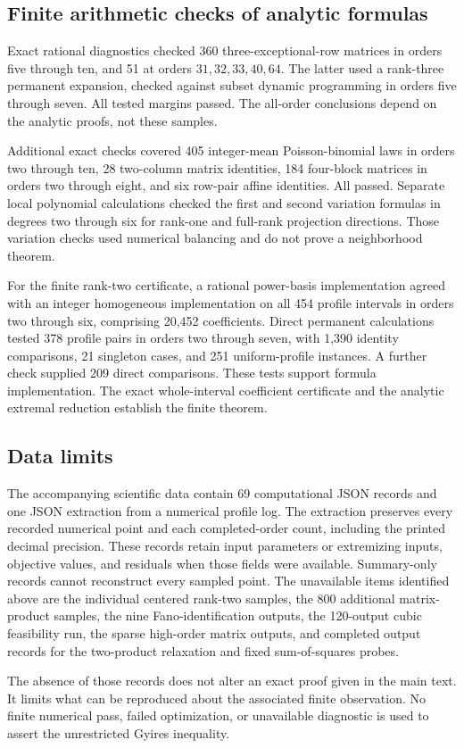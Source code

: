 \subsection{Finite arithmetic checks of analytic formulas}\label{app:finite-13}

Exact rational diagnostics checked 360 three-exceptional-row matrices in orders five through ten, and 51 at orders \(31,32,33,40,64\). The latter used a rank-three permanent expansion, checked against subset dynamic programming in orders five through seven. All tested margins passed. The all-order conclusions depend on the analytic proofs, not these samples.

Additional exact checks covered 405 integer-mean Poisson-binomial laws in orders two through ten, 28 two-column matrix identities, 184 four-block matrices in orders two through eight, and six row-pair affine identities. All passed. Separate local polynomial calculations checked the first and second variation formulas in degrees two through six for rank-one and full-rank projection directions. Those variation checks used numerical balancing and do not prove a neighborhood theorem.

For the finite rank-two certificate, a rational power-basis implementation agreed with an integer homogeneous implementation on all 454 profile intervals in orders two through six, comprising 20,452 coefficients. Direct permanent calculations tested 378 profile pairs in orders two through seven, with 1,390 identity comparisons, 21 singleton cases, and 251 uniform-profile instances. A further check supplied 209 direct comparisons. These tests support formula implementation. The exact whole-interval coefficient certificate and the analytic extremal reduction establish the finite theorem.

\subsection{Data limits}\label{app:finite-14}

The accompanying scientific data contain 69 computational JSON records and one JSON extraction from a numerical profile log. The extraction preserves every recorded numerical point and each completed-order count, including the printed decimal precision. These records retain input parameters or extremizing inputs, objective values, and residuals when those fields were available. Summary-only records cannot reconstruct every sampled point. The unavailable items identified above are the individual centered rank-two samples, the 800 additional matrix-product samples, the nine Fano-identification outputs, the 120-output cubic feasibility run, the sparse high-order matrix outputs, and completed output records for the two-product relaxation and fixed sum-of-squares probes.

The absence of those records does not alter an exact proof given in the main text. It limits what can be reproduced about the associated finite observation. No finite numerical pass, failed optimization, or unavailable diagnostic is used to assert the unrestricted Gyires inequality.
